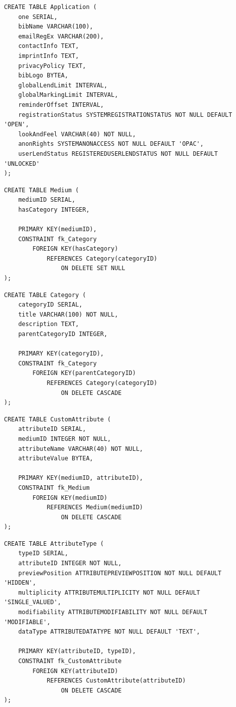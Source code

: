 \documentclass{article}
\begin{document}
\hypertarget{Application}{}
\begin{lstlisting}
CREATE TABLE Application (
	one SERIAL,
	bibName VARCHAR(100),
	emailRegEx VARCHAR(200),
	contactInfo TEXT,
	imprintInfo TEXT,
	privacyPolicy TEXT,
	bibLogo BYTEA,
	globalLendLimit INTERVAL,
	globalMarkingLimit INTERVAL,
	reminderOffset INTERVAL,	
	registrationStatus SYSTEMREGISTRATIONSTATUS NOT NULL DEFAULT 'OPEN',
	lookAndFeel VARCHAR(40) NOT NULL,
	anonRights SYSTEMANONACCESS NOT NULL DEFAULT 'OPAC',
	userLendStatus REGISTEREDUSERLENDSTATUS NOT NULL DEFAULT 'UNLOCKED'	
);
\end{lstlisting}
\hypertarget{Medium}{}
\begin{lstlisting}
CREATE TABLE Medium ( 
	mediumID SERIAL,
	hasCategory INTEGER,
	
	PRIMARY KEY(mediumID),
	CONSTRAINT fk_Category 
		FOREIGN KEY(hasCategory) 
			REFERENCES Category(categoryID) 
				ON DELETE SET NULL
);
\end{lstlisting} 
\hypertarget{Category}{}
\begin{lstlisting}
CREATE TABLE Category (
	categoryID SERIAL,
	title VARCHAR(100) NOT NULL,
	description TEXT,
	parentCategoryID INTEGER,
	
	PRIMARY KEY(categoryID),
	CONSTRAINT fk_Category
		FOREIGN KEY(parentCategoryID)
			REFERENCES Category(categoryID) 
				ON DELETE CASCADE
);
\end{lstlisting} 
\hypertarget{CustomAttribute}{}
\begin{lstlisting}
CREATE TABLE CustomAttribute (
	attributeID SERIAL,
	mediumID INTEGER NOT NULL,
	attributeName VARCHAR(40) NOT NULL,
	attributeValue BYTEA,
	
	PRIMARY KEY(mediumID, attributeID),
	CONSTRAINT fk_Medium 
		FOREIGN KEY(mediumID) 
			REFERENCES Medium(mediumID) 
				ON DELETE CASCADE
);
\end{lstlisting} 
\hypertarget{AttributeType}{}
\begin{lstlisting}
CREATE TABLE AttributeType (
	typeID SERIAL,
	attributeID INTEGER NOT NULL,
	previewPosition ATTRIBUTEPREVIEWPOSITION NOT NULL DEFAULT 'HIDDEN',
	multiplicity ATTRIBUTEMULTIPLICITY NOT NULL DEFAULT 'SINGLE_VALUED',
	modifiability ATTRIBUTEMODIFIABILITY NOT NULL DEFAULT 'MODIFIABLE',
	dataType ATTRIBUTEDATATYPE NOT NULL DEFAULT 'TEXT',
	
	PRIMARY KEY(attributeID, typeID),
	CONSTRAINT fk_CustomAttribute 
		FOREIGN KEY(attributeID) 
			REFERENCES CustomAttribute(attributeID) 
				ON DELETE CASCADE
);
\end{lstlisting}
\end{document}

